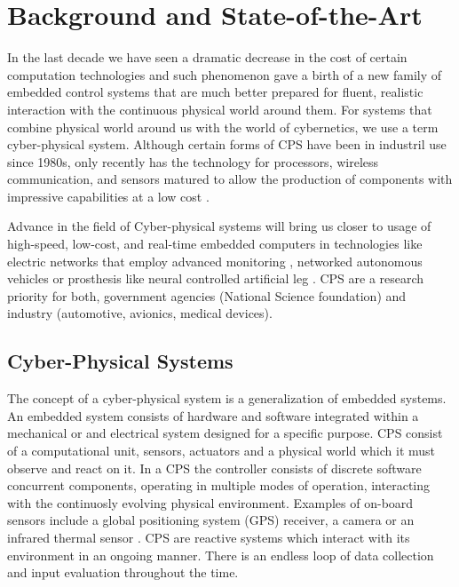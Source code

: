 \chapter{Background and State-of-the-Art}
\label{chap.stateoftheart}

In the last decade we have seen a dramatic decrease in the cost of certain computation technologies and such phenomenon gave a birth of a new family of embedded control systems that are much better prepared for fluent, realistic interaction with the continuous physical world around them. For systems that combine physical world around us with the world of cybernetics, we use a term cyber-physical system. Although certain forms of CPS have been in industril use since 1980s, only recently has the technology for processors, wireless communication, and sensors matured to allow the production of components with impressive capabilities at a low cost \cite{Rajeev:PrinciplesCPS}.

Advance in the field of Cyber-physical systems will bring us closer to usage of high-speed, low-cost, and real-time embedded computers in technologies like electric networks that employ advanced monitoring \cite{Xue:SmartGrids}, networked autonomous vehicles \cite{Lee:DesignCPS} or prosthesis like neural controlled artificial leg \cite{Zhang:ArtificialLegs}. CPS are a research priority for both, government agencies (National Science foundation) and industry (automotive, avionics, medical devices).

\section{Cyber-Physical Systems}

The concept of a cyber-physical system is a generalization of embedded systems. An embedded system consists of hardware and software integrated within a mechanical or and electrical system designed for a specific purpose. CPS consist of a computational unit, sensors, actuators and a physical world which it must observe and react on it. In a CPS the controller consists of discrete software concurrent components, operating in multiple modes of operation, interacting with the continuosly evolving physical environment. Examples of on-board sensors include a global positioning system (GPS) receiver, a camera or an infrared thermal sensor \cite{Rajeev:PrinciplesCPS}. CPS are reactive systems which interact with its environment in an ongoing manner. There is an endless loop of data collection and input evaluation throughout the time.

